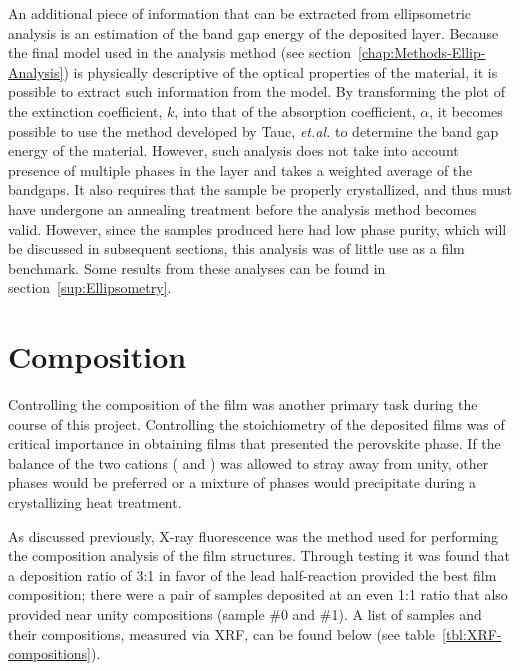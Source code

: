 An additional piece of information that can be extracted from ellipsometric analysis is an estimation of the band gap energy of the deposited layer. Because the final model used in the analysis method (see section~\vref{chap:Methods-Ellip-Analysis}) is physically descriptive of the optical properties of the material, it is possible to extract such information from the model. By transforming the plot of the extinction coefficient, $k$, into that of the absorption coefficient, $\alpha$, it becomes possible to use the method developed by Tauc, \emph{et.al.}  to determine the band gap energy of the material. However, such analysis does not take into account presence of multiple phases in the layer and takes a weighted average of the bandgaps. It also requires that the sample be properly crystallized, and thus must have undergone an annealing treatment before the analysis method becomes valid. However, since the samples produced here had low phase purity, which will be discussed in subsequent sections, this analysis was of little use as a film benchmark. Some results from these analyses can be found in section~\vref{sup:Ellipsometry}.


\section{Composition}
\label{chap:Results-Composition}

Controlling the composition of the film was another primary task during the course of this project. Controlling the stoichiometry of the deposited films was of critical importance in obtaining films that presented the perovskite phase. If the balance of the two cations (\PbIon{} and \TiIon{}) was allowed to stray away from unity, other phases would be preferred or a mixture of phases would precipitate during a crystallizing heat treatment.  

As discussed previously, X-ray fluorescence was the method used for performing the composition analysis of the film structures. Through testing it was found that a deposition ratio of 3:1 in favor of the lead half-reaction provided the best film composition; there were a pair of samples deposited at an even 1:1 ratio that also provided near unity compositions (sample \#0 and \#1). A list of samples and their compositions, measured via XRF, can be found below (see table~\vref{tbl:XRF-compositions}). 

